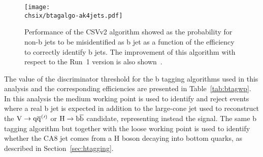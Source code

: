 \begin{figure}[!htb]
 \begin{center}
  \texttt{[image: \\chsix/btagalgo-ak4jets.pdf]}
 \end{center}
 \caption{Performance of the CSVv2 algorithm showed as the probability for non-b jets to be misidentified as b jet as a function of the efficiency to correctly identify b jets. The improvement of this algorithm with respect to the Run~1 version is also shown~\cite{CMS-PAS-BTV-15-001}.}
 \label{fig:btagalgo}
\end{figure}

The value of the discriminator threshold for the b tagging algorithms used in this analysis and the corresponding efficiencies are presented in Table~\ref{tab:btagwp}.
In this analysis the medium working point is used to identify and reject \ttbar events where a real b jet is expected in addition to the large-cone jet used to reconstruct the $\mathrm{V}\to\mathrm{q}\overline{\mathrm{q}}^({}'^){}$ or $\mathrm{H}\to{\mathrm{b}\overline{\mathrm{b}}}$ candidate, representing instead the signal. The same b tagging algorithm but together with the loose working point is used to identify whether the CA8 jet comes from a H boson decaying into bottom quarks, as described in Section~\ref{sec:htagging}.

\begin{table}[!htb]
\centering
\caption{B taggers and discriminator threshold used in CMS for Run~1 and Run~2 and corresponding efficiency for b jets with $\pt > 30\GeV$ in simulated \ttbar events. }
\label{tab:btagwp}
\end{table}

